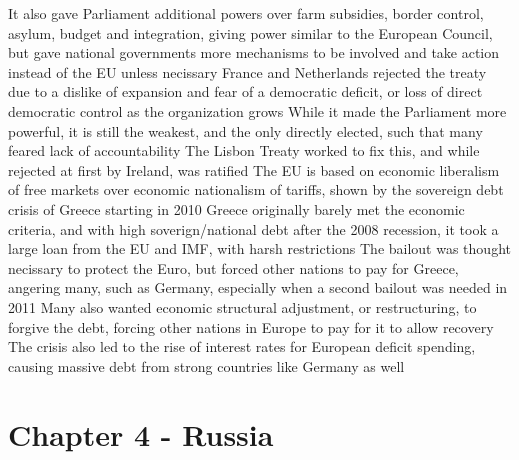 \documentclass[11 pt, twoside]{article}
\newenvironment{outline*}
{
	\begin{outline}[enumerate]
	}
	{\end{outline}
}
\begin{document}
\begin{outline*}
\2 It also gave Parliament additional powers over farm subsidies, border control, asylum, budget and integration, giving power similar to the European Council, but gave national governments more mechanisms to be involved and take action instead of the EU unless necissary
\2 France and Netherlands rejected the treaty due to a dislike of expansion and fear of a democratic deficit, or loss of direct democratic control as the organization grows
\2 While it made the Parliament more powerful, it is still the weakest, and the only directly elected, such that many feared lack of accountability
\2 The Lisbon Treaty worked to fix this, and while rejected at first by Ireland, was ratified
\1 The EU is based on economic liberalism of free markets over economic nationalism of tariffs, shown by the sovereign debt crisis of Greece starting in 2010
\2 Greece originally barely met the economic criteria, and with high soverign/national debt after the 2008 recession, it took a large loan from the EU and IMF, with harsh restrictions
\2 The bailout was thought necissary to protect the Euro, but forced other nations to pay for Greece, angering many, such as Germany, especially when a second bailout was needed in 2011
\2 Many also wanted economic structural adjustment, or restructuring, to forgive the debt, forcing other nations in Europe to pay for it to allow recovery
\2 The crisis also led to the rise of interest rates for European deficit spending, causing massive debt from strong countries like Germany as well
\end{outline*}
\section{Chapter 4 - Russia}
\end{document}
